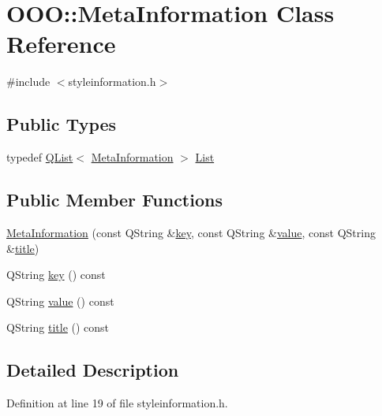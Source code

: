 \hypertarget{classOOO_1_1MetaInformation}{\section{O\+O\+O\+:\+:Meta\+Information Class Reference}
\label{classOOO_1_1MetaInformation}
}


{\ttfamily \#include $<$styleinformation.\+h$>$}

\subsection*{Public Types}
\begin{DoxyCompactItemize}
\item 
typedef \hyperlink{classQList}{Q\+List}$<$ \hyperlink{classOOO_1_1MetaInformation}{Meta\+Information} $>$ \hyperlink{classOOO_1_1MetaInformation_a14354c0600d66097b44f2d84527795d2}{List}
\end{DoxyCompactItemize}
\subsection*{Public Member Functions}
\begin{DoxyCompactItemize}
\item 
\hyperlink{classOOO_1_1MetaInformation_a727044efd45139b0ec2a025bea6640ad}{Meta\+Information} (const Q\+String \&\hyperlink{classOOO_1_1MetaInformation_aaf27be9bdb8e64fa246e67665ed01273}{key}, const Q\+String \&\hyperlink{classOOO_1_1MetaInformation_aa78b6df31da717c0de2320f9e5312789}{value}, const Q\+String \&\hyperlink{classOOO_1_1MetaInformation_a8bed20711b974fee3a06215f05b1f80a}{title})
\item 
Q\+String \hyperlink{classOOO_1_1MetaInformation_aaf27be9bdb8e64fa246e67665ed01273}{key} () const 
\item 
Q\+String \hyperlink{classOOO_1_1MetaInformation_aa78b6df31da717c0de2320f9e5312789}{value} () const 
\item 
Q\+String \hyperlink{classOOO_1_1MetaInformation_a8bed20711b974fee3a06215f05b1f80a}{title} () const 
\end{DoxyCompactItemize}


\subsection{Detailed Description}


Definition at line 19 of file styleinformation.\+h.



